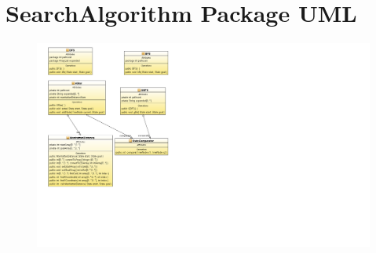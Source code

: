 \documentclass[journal]{IEEEtran}
\begin{document}
\newpage
\section{SearchAlgorithm Package UML}\label{searchAlgorithmUML}
\begin{figure}[h]
\centering
\includegraphics[width=1.6\textwidth,natwidth=610,natheight=642]{../Model/CSM6120_Assignment2-Model/ClassDiagram2.png} 

\end{figure}

\newpage

\twocolumn




\end{document}
